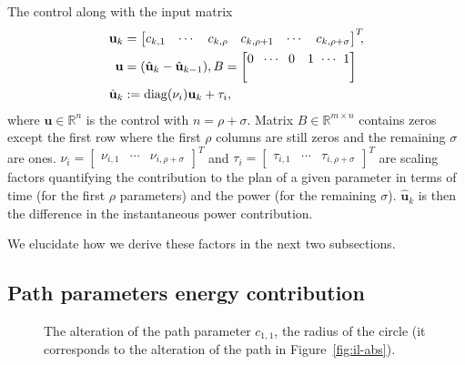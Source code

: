 \documentclass[letterpaper,10pt,conference]{ieeeconf}
\newcommand{\figpath}{./figures}
\theoremstyle{definition}
\begin{document}
The control along with the input matrix
\begin{equation}\label{eq:state-control}\begin{split}
  \mathbf{u}_k&=\begin{bmatrix}c_{k,1} & \cdots & c_{k,\rho} & c_{k,\rho+1} & \cdots & c_{k,\rho+\sigma}\end{bmatrix}^T\hspace*{-1ex},\\
  \mathbf{u}&=(\hat{\mathbf{u}}_k-\hat{\mathbf{u}}_{k-1}),B=\begin{bmatrix} 0 &\hspace*{-.5ex} \cdots\hspace*{-.5ex} & 0 & 1 &\hspace*{-1ex} \cdots\hspace*{-1ex} & 1 \\ & & & & & \end{bmatrix}\\
  \hat{\mathbf{u}}_k&:=\mathrm{diag}(\nu_i)\mathbf{u}_k+\tau_i,\,\,\,
\end{split}\end{equation}
where $\mathbf{u}\in\mathbb{R}^n$ is the control with $n=\rho+\sigma$. Matrix $B\in\mathbb{R}^{m\times n}$ contains zeros except the first row where the first $\rho$ columns are still zeros and the remaining $\sigma$ are ones. $\nu_i=\begin{bmatrix}\nu_{i,1} & \cdots & \nu_{i,\rho+\sigma}\end{bmatrix}^T$ and $\tau_i=\begin{bmatrix}\tau_{i,1} & \cdots & \tau_{i,\rho+\sigma}\end{bmatrix}^T$ are scaling factors quantifying the contribution to the plan of a given parameter in terms of time (for the first $\rho$ parameters) and the power (for the remaining $\sigma$). $\hat{\mathbf{u}}_k$ is then the difference in the instantaneous power contribution.

We elucidate how we derive these factors in the next two subsections.

\subsection{Path parameters energy contribution}
\label{sec:model}

\begin{figure}[h]
  \centering
  
  \caption{The alteration of the path parameter $c_{1,1}$, the radius of the circle (it corresponds to the alteration of the path in Figure~\ref{fig:il-abs}).}
  \label{fig:tee1}
\end{figure}
\end{document}
